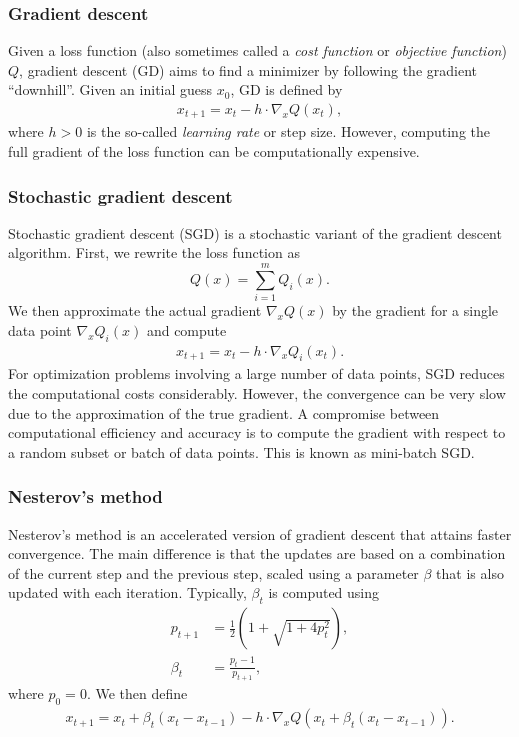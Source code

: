 \documentclass
[
    a4paper,
    DIV=11,
    abstract=true,
    11pt,
]
{scrartcl}
\theoremstyle{definition}
\begin{document}
\subsubsection{Gradient descent}

Given a loss function (also sometimes called a \emph{cost function} or \emph{objective function}) $ Q $, gradient descent (GD) aims to find a minimizer by following the gradient ``downhill''. Given an initial guess $ x_0 $, GD is defined by
\begin{align*}
    x_{t+1} = x_t - h \cdot \nabla_x Q(x_t),
\end{align*}
where $h>0$ is the so-called \emph{learning rate} or step size. However, computing the full gradient of the loss function can be computationally expensive.

\subsubsection{Stochastic gradient descent}

Stochastic gradient descent (SGD) is a stochastic variant of the gradient descent algorithm. First, we rewrite the loss function as
\begin{equation*}
     Q(x) = \sum_{i=1}^m Q_i(x).
\end{equation*}
We then approximate the actual gradient $\nabla_x Q(x)$ by the gradient for a single data point $\nabla_x Q_i(x)$ and compute
\begin{align*}
    x_{t+1} = x_t - h \cdot \nabla_x Q_i(x_t).
\end{align*}
For optimization problems involving a large number of data points, SGD reduces the computational costs considerably. However, the convergence can be very slow due to the approximation of the true gradient. A compromise between computational efficiency and accuracy is to compute the gradient with respect to a random subset or batch of data points. This is known as mini-batch SGD.

\subsubsection{Nesterov's method}

Nesterov's method \cite{nesterov2018lectures,nesterov1983} is an accelerated version of gradient descent that attains faster convergence. The main difference is that the updates are based on a combination of the current step and the previous step, scaled using a parameter $\beta$ that is also updated with each iteration. Typically, $\beta_t$ is computed using
\begin{align*}
    p_{t+1} &= \frac{1}{2}\left(1 + \sqrt{1 + 4p_t^2}\right), \\
    \beta_t &= \frac{p_t - 1}{p_{t+1}},
\end{align*}
where $ p_0 = 0 $. We then define
\begin{align*}
    x_{t+1} = x_t + \beta_t(x_t - x_{t-1}) - h \cdot \nabla_x Q(x_t + \beta_t(x_t - x_{t-1})).
\end{align*}
\end{document}
